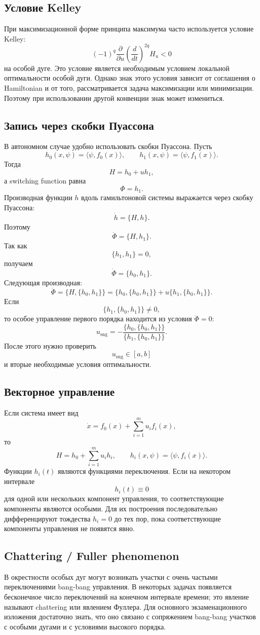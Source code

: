 \documentclass[12pt,a4paper]{article}
\newcommand{\sng}{\mathrm{sng}}
\begin{document}
\subsection*{Условие Kelley}
При максимизационной форме принципа максимума часто используется условие Kelley:
\[
(-1)^q
\frac{\partial}{\partial u}
\left(\frac{d}{dt}\right)^{2q}H_u
<0
\]
на особой дуге. Это условие является необходимым условием локальной оптимальности особой дуги. Однако знак этого условия зависит от соглашения о Hamiltonian и от того, рассматривается задача максимизации или минимизации. Поэтому при использовании другой конвенции знак может измениться.

\subsection*{Запись через скобки Пуассона}
В автономном случае удобно использовать скобки Пуассона. Пусть
\[
h_0(x,\psi)=\langle \psi,f_0(x)\rangle,
\qquad
h_1(x,\psi)=\langle \psi,f_1(x)\rangle.
\]
Тогда
\[
H=h_0+u h_1,
\]
а switching function равна
\[
\Phi=h_1.
\]
Производная функции $h$ вдоль гамильтоновой системы выражается через скобку Пуассона:
\[
\dot h=\{H,h\}.
\]
Поэтому
\[
\dot\Phi=\{H,h_1\}.
\]
Так как
\[
\{h_1,h_1\}=0,
\]
получаем
\[
\dot\Phi=\{h_0,h_1\}.
\]
Следующая производная:
\[
\ddot\Phi
=
\{H,\{h_0,h_1\}\}
=
\{h_0,\{h_0,h_1\}\}
+
u\{h_1,\{h_0,h_1\}\}.
\]
Если
\[
\{h_1,\{h_0,h_1\}\}\ne0,
\]
то особое управление первого порядка находится из условия $\ddot\Phi=0$:
\[
u_{\sng}
=
-
\frac{\{h_0,\{h_0,h_1\}\}}
{\{h_1,\{h_0,h_1\}\}}.
\]
После этого нужно проверить
\[
u_{\sng}\in[a,b]
\]
и вторые необходимые условия оптимальности.

\subsection*{Векторное управление}
Если система имеет вид
\[
\dot x=f_0(x)+\sum_{i=1}^m u_i f_i(x),
\]
то
\[
H=h_0+\sum_{i=1}^m u_i h_i,
\qquad
h_i(x,\psi)=\langle \psi,f_i(x)\rangle.
\]
Функции $h_i(t)$ являются функциями переключения. Если на некотором интервале
\[
h_i(t)\equiv0
\]
для одной или нескольких компонент управления, то соответствующие компоненты являются особыми. Для их построения последовательно дифференцируют тождества $h_i=0$ до тех пор, пока соответствующие компоненты управления не появятся явно.

\subsection*{Chattering / Fuller phenomenon}
В окрестности особых дуг могут возникать участки с очень частыми переключениями bang-bang управления. В некоторых задачах появляется бесконечное число переключений на конечном интервале времени; это явление называют chattering или явлением Фуллера. Для основного экзаменационного изложения достаточно знать, что оно связано с сопряжением bang-bang участков с особыми дугами и с условиями высокого порядка.
\end{document}
